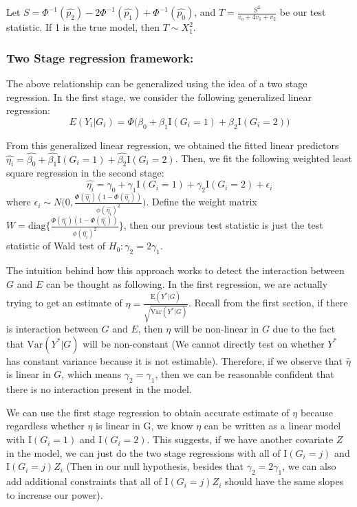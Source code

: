\documentclass[
]{article}
\begin{document}
Let
\(S = \Phi^{-1}(\hat{p_2}) - 2\Phi^{-1}(\hat{p_1}) + \Phi^{-1}(\hat{p_0})\),
and \(T = \frac{S^2}{v_o+4v_1+v_2}\) be our test statistic. If 1 is the
true model, then \(T \sim X^2_{1}\).

\hypertarget{two-stage-regression-framework}{%
\subsubsection{Two Stage regression
framework:}\label{two-stage-regression-framework}}

The above relationship can be generalized using the idea of a two stage
regression. In the first stage, we consider the following generalized
linear regression:
\[ E(Y_i|G_i) = \Phi\bigg(\beta_0+ \beta_1 \text{I}(G_i =1) + \beta_2 \text{I}(G_i =2)\bigg)\]

From this generalized linear regression, we obtained the fitted linear
predictors
\(\hat{\eta_i} = \hat{\beta_0}+\hat{\beta_1}\text{I}(G_i =1) + \hat{\beta_2} \text{I}(G_i =2)\).
Then, we fit the following weighted least square regression in the
second stage:
\[ \hat{\eta_i} = \gamma_0 +\gamma_1  \text{I}(G_i =1) + \gamma_2 \text{I}(G_i =2) +\epsilon_i\]
where
\(\epsilon_i \sim N\bigg(0,\frac{\Phi(\hat{\eta_i})(1-\Phi(\hat{\eta_i}))}{\phi(\hat{\eta_i})^2} \bigg)\).
Define the weight matrix
\(W = \text{diag}\{\frac{\Phi(\hat{\eta_i})(1-\Phi(\hat{\eta_i}))}{\phi(\hat{\eta_i})^2}\}\),
then our previous test statistic is just the test statistic of Wald test
of \(H_0:\gamma_2 = 2\gamma_1\).

The intuition behind how this approach works to detect the interaction
between \(G\) and \(E\) can be thought as following. In the first
regression, we are actually trying to get an estimate of
\(\eta = \frac{\text{E}(Y^*|G)}{\sqrt{\text{Var}(Y^*|G)}}\). Recall from
the first section, if there is interaction between \(G\) and \(E\), then
\(\eta\) will be non-linear in \(G\) due to the fact that
\(\text{Var}(Y^*|G)\) will be non-constant (We cannot directly test on
whether \(Y^*\) has constant variance because it is not estimable).
Therefore, if we observe that \(\hat{\eta}\) is linear in \(G\), which
means \(\gamma_2 = \gamma_1\), then we can be reasonable confident that
there is no interaction present in the model.

We can use the first stage regression to obtain accurate estimate of
\(\eta\) because regardless whether \(\eta\) is linear in G, we know
\(\eta\) can be written as a linear model with \(\text{I}(G_i =1)\) and
\(\text{I}(G_i =2)\). This suggests, if we have another covariate \(Z\)
in the model, we can just do the two stage regressions with all of
\(\text{I}(G_i =j)\) and \(\text{I}(G_i =j)Z_i\) (Then in our null
hypothesis, besides that \(\gamma_2 = 2 \gamma_1\), we can also add
additional constraints that all of \(\text{I}(G_i =j)Z_i\) should have
the same slopes to increase our power).
\end{document}
